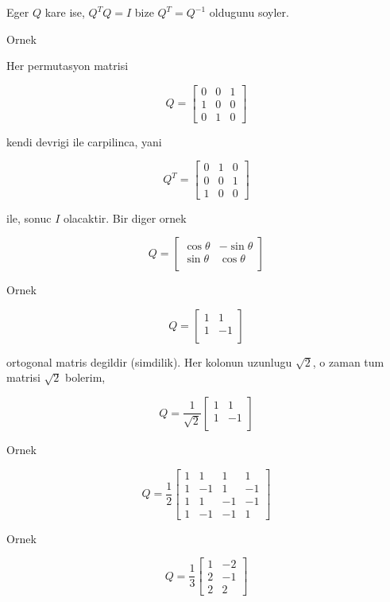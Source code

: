 \documentclass[12pt,fleqn]{article}\usepackage{../common}
\begin{document}
Eger $Q$ kare ise, $Q^TQ = I$  bize $Q^T = Q^{-1}$ oldugunu soyler. 

Ornek 

Her permutasyon matrisi 

\[ 
Q = 
\left[\begin{array}{rrr}
0 & 0 & 1 \\
1 & 0 & 0 \\
0 & 1 & 0 
\end{array}\right]
 \]

kendi devrigi ile carpilinca, yani 

\[ 
Q^T = 
\left[\begin{array}{rrr}
0 & 1 & 0 \\
0 & 0 & 1 \\
1 & 0 & 0 
\end{array}\right]
 \]

ile, sonuc $I$ olacaktir. Bir diger ornek 

\[ Q = 
\left[\begin{array}{cc}
\cos \theta & -\sin \theta \\
\sin \theta & \cos \theta \\
\end{array}\right]
 \]


Ornek

\[ Q = 
\left[\begin{array}{cc}
1 & 1 \\
1 & -1 \\
\end{array}\right]
 \]

ortogonal matris degildir (simdilik). Her kolonun uzunlugu $\sqrt{2}$, o
zaman tum matrisi $\sqrt{2}$ bolerim,

\[ Q = \frac{1}{\sqrt{2}}
\left[\begin{array}{cc}
1 & 1 \\
1 & -1 \\
\end{array}\right]
 \]

Ornek 

\[ Q = \frac{ 1}{2}
\left[\begin{array}{rrrr}
1 & 1& 1& 1 \\
1 & -1& 1& -1 \\
1 & 1& -1& -1 \\
1 & -1& -1& 1 
\end{array}\right]
 \]

Ornek 

\[ Q = \frac{ 1}{3}
\left[\begin{array}{rr}
1 & -2 \\
2 & -1 \\
2 & 2 
\end{array}\right]
 \]
\end{document}
